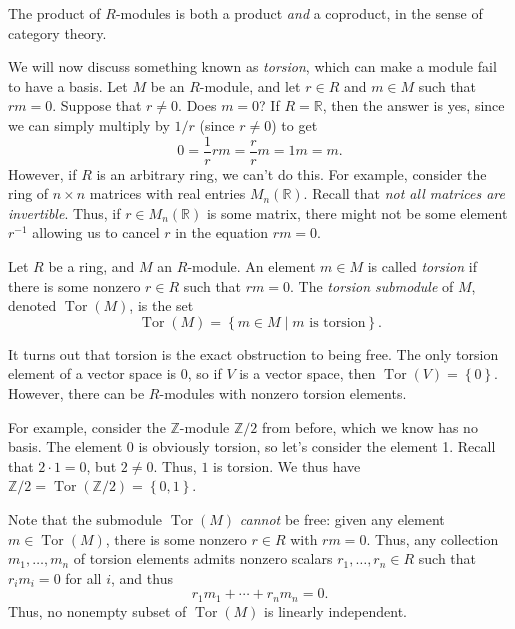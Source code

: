 \begin{remark}\label{rmk:prod-coprod}
	The product of $R$-modules is both a product \emph{and} a coproduct, in the sense of category theory.
\end{remark}

We will now discuss something known as \emph{torsion}, which can make a module fail to have a basis. Let $M$ be an $R$-module, and let $r\in R$ and $m\in M$ such that $r m=0$. Suppose that $r\neq 0$. Does $m=0$? If $R=\mathbb{R} $, then the answer is yes, since we can simply multiply by $1/r$ (since $r\neq 0$) to get
\[
	0=\frac{1}{r} r m = \frac{r}{r} m = 1m = m
.\]
However, if $R$ is an arbitrary ring, we can't do this. For example, consider the ring of $n\times n$ matrices with real entries $M_n(\mathbb{R} )$. Recall that \emph{not all matrices are invertible}. Thus, if $r\in M_n(\mathbb{R} )$ is some matrix, there might not be some element $r^{-1} $ allowing us to cancel $r$ in the equation $r m=0$.

\begin{definition}\label{dfn:torsion}
	Let $R$ be a ring, and $M$ an $R$-module. An element $m\in M$ is called \emph{torsion} if there is some nonzero $r\in R$ such that $r m=0$. The \emph{torsion submodule} of $M$, denoted $\operatorname{Tor} (M)$, is the set
	\[
		\operatorname{Tor} (M) = \left\{ m\in M\mid m\text{ is torsion}  \right\} 
	.\]
\end{definition}

It turns out that torsion is the exact obstruction to being free. The only torsion element of a vector space is 0, so if $V$ is a vector space, then $\operatorname{Tor} (V)=\left\{ 0 \right\} $. However, there can be $R$-modules with nonzero torsion elements.

For example, consider the $\mathbb{Z} $-module $\mathbb{Z} /2$ from before, which we know has no basis. The element 0 is obviously torsion, so let's consider the element 1. Recall that $2\cdot 1=0$, but $2\neq 0$. Thus, $1$ is torsion. We thus have $\mathbb{Z} /2 = \operatorname{Tor} (\mathbb{Z} /2)=\left\{ 0,1 \right\} $.

Note that the submodule $\operatorname{Tor} (M)$ \emph{cannot} be free: given any element $m\in \operatorname{Tor} (M)$, there is some nonzero $r\in R$ with $r m=0$. Thus, any collection $m_1, \ldots ,m_n$ of torsion elements admits nonzero scalars $r_1, \ldots ,r_n\in R$ such that $r_i m_i=0$ for all $i$, and thus
\[
	r_1m_1 + \cdots + r_nm_n=0
.\]
Thus, no nonempty subset of $\operatorname{Tor} (M)$ is linearly independent.

